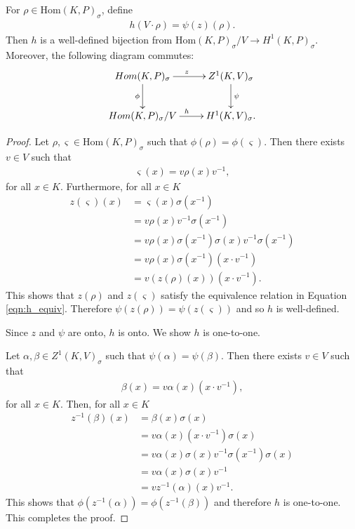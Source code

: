 \begin{lemma}
For $\rho \in \mathrm{Hom}(K, P)_\sigma$, define
\begin{align*}
h(V \cdot \rho) = \psi(z)(\rho).
\end{align*}
Then $h$ is a well-defined bijection from $\mathrm{Hom}(K, P)_\sigma / V \rightarrow H^1(K, P)_\sigma$. Moreover, the following diagram commutes:
  \begin{align*}
    \xymatrix{
    Hom(K, P)_{\sigma} \ar[r]^z \ar[d]_\phi & Z^{1}(K, V)_\sigma \ar[d]^\psi \\
    Hom(K, P)_{\sigma}/V \ar[r]^h & H^{1}(K, V)_\sigma.
    }
  \end{align*}
  \label{lem:v_h1}
\end{lemma}
\begin{proof}  
Let $\rho, \varsigma \in \mathrm{Hom}(K, P)_\sigma$ such that $\phi(\rho) = \phi(\varsigma)$. Then there exists $v \in V$ such that
\begin{align*} \varsigma(x) =  v\rho(x)v^{-1}, \end{align*}
for all $x \in K$. Furthermore, for all $x \in K$
\begin{align*}
z(\varsigma)(x) %
&= \varsigma(x)\sigma(x^{-1}) \\
&= v \rho(x) v^{-1} \sigma(x^{-1}) \\
&= v \rho(x) \sigma(x^{-1})\sigma(x) v^{-1} \sigma(x^{-1}) \\
&= v \rho(x) \sigma(x^{-1}) \left(x \cdot v^{-1}\right) \\
&= v \left(z(\rho)(x)\right) \left(x \cdot v^{-1}\right).
\end{align*}
This shows that $z(\rho)$ and $z(\varsigma)$ satisfy the equivalence relation in Equation \ref{eqn:h_equiv}. Therefore $\psi\left(z(\rho)\right) = \psi\left(z(\varsigma)\right)$ and so $h$ is well-defined.

Since $z$ and $\psi$ are onto, $h$ is onto. We show $h$ is one-to-one.

Let $\alpha, \beta \in Z^1(K, V)_\sigma$ such that $\psi(\alpha) = \psi(\beta)$. Then there exists $v \in V$ such that
\begin{align*} \beta(x) = v \alpha(x) \left(x \cdot v^{-1}\right), \end{align*}
for all $x \in K$. Then, for all $x \in K$
\begin{align*}
z^{-1}(\beta)(x) 
&= \beta(x)\sigma(x) \\
&= v \alpha(x) \left(x \cdot v^{-1}\right) \sigma(x) \\
&= v \alpha(x) \sigma(x) v^{-1} \sigma(x^{-1}) \sigma(x) \\
&= v \alpha(x) \sigma(x) v^{-1} \\
&= v z^{-1}(\alpha)(x) v^{-1}.
\end{align*}
This shows that $\phi\left(z^{-1}(\alpha)\right) = \phi\left(z^{-1}(\beta)\right)$ and therefore $h$ is one-to-one. This completes the proof.
\end{proof}


